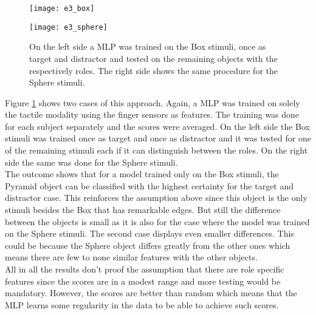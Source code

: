 \begin{figure}
	\begin{minipage}[t]{0.49\textwidth}
		\texttt{[image: e3\_box]}
	\end{minipage}
	\hspace{\fill}
	\begin{minipage}[t]{0.49\textwidth}
		\texttt{[image: e3\_sphere]}
	\end{minipage}
	\caption{On the left side a MLP was trained on the Box stimuli, once as target and distractor and tested on the remaining objects with the respectively roles. The right side shows the same procedure for the Sphere stimuli.}
	\label{e3}
\end{figure}

Figure \ref{e3} shows two cases of this approach. Again, a MLP was trained on solely the tactile modality using the finger sensors as features. The training was done for each subject separately and the scores were averaged. On the left side the Box stimuli was trained once as target and once as distractor and it was tested for one of the remaining stimuli each if it can distinguish between the roles. On the right side the same was done for the Sphere stimuli.\\
The outcome shows that for a model trained only on the Box stimuli, the Pyramid object can be classified with the highest certainty for the target and distractor case. This reinforces the assumption above since this object is the only stimuli besides the Box that has remarkable edges. But still the difference between the objects is small as it is also for the case where the model was trained on the Sphere stimuli. The second case displays even smaller differences. This could be because the Sphere object differs greatly from the other ones which means there are few to none similar features with the other objects.\\
All in all the results don't proof the assumption that there are role specific features since the scores are in a modest range and more testing would be mandatory. However, the scores are better than random which means that the MLP learns some regularity in the data to be able to achieve such scores. 